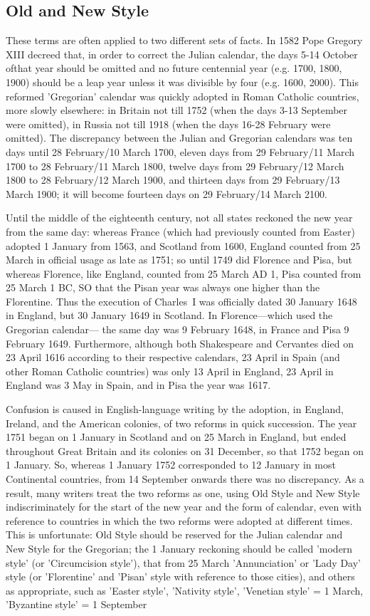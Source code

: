 \subsection{Old and New Style}
These terms are often applied to two different sets of facts. In 1582 Pope
Gregory XIII decreed that, in order to correct the Julian calendar, the
days 5-14 October ofthat year should be omitted and no future centennial
year (e.g. 1700, 1800, 1900) should be a leap year unless it was
divisible by four (e.g. 1600, 2000). This reformed 'Gregorian' calendar
was quickly adopted in Roman Catholic countries, more slowly elsewhere:
in Britain not till 1752 (when the days 3-13 September were
omitted), in Russia not till 1918 (when the days 16-28 February were
omitted). The discrepancy between the Julian and Gregorian calendars
was ten days until 28 February/10 March 1700, eleven days from 29
February/11 March 1700 to 28 February/11 March 1800, twelve days
from 29 February/12 March 1800 to 28 February/12 March 1900, and
thirteen days from 29 February/13 March 1900; it will become fourteen
days on 29 February/14 March 2100.

Until the middle of the eighteenth century, not all states reckoned the
new year from the same day: whereas France (which had previously
counted from Easter) adopted 1 January from 1563, and Scotland from
1600, England counted from 25 March in official usage as late as 1751; so
until 1749 did Florence and Pisa, but whereas Florence, like England,
counted from 25 March AD 1, Pisa counted from 25 March 1 BC, SO that the
Pisan year was always one higher than the Florentine. Thus the execution
of Charles~I was officially dated 30 January 1648 in England, but 30
January 1649 in Scotland. In Florence---which used the Gregorian calendar---
the same day was 9 February 1648, in France and Pisa 9 February
1649. Furthermore, although both Shakespeare and Cervantes died on 23
April 1616 according to their respective calendars, 23 April in Spain (and
other Roman Catholic countries) was only 13 April in England, 23 April in
England was 3 May in Spain, and in Pisa the year was 1617.

Confusion is caused in English-language writing by the adoption, in
England, Ireland, and the American colonies, of two reforms in quick
succession. The year 1751 began on 1 January in Scotland and on 25
March in England, but ended throughout Great Britain and its colonies
on 31 December, so that 1752 began on 1 January. So, whereas 1 January
1752 corresponded to 12 January in most Continental countries, from 14
September onwards there was no discrepancy.
As a result, many writers treat the two reforms as one, using Old Style
and New Style indiscriminately for the start of the new year and the
form of calendar, even with reference to countries in which the two
reforms were adopted at different times. This is unfortunate: Old Style
should be reserved for the Julian calendar and New Style for the Gregorian;
the 1 January reckoning should be called 'modern style' (or 'Circumcision
style'), that from 25 March 'Annunciation' or 'Lady Day' style (or
'Florentine' and 'Pisan' style with reference to those cities), and others
as appropriate, such as 'Easter style', 'Nativity style', 'Venetian style' =
1 March, 'Byzantine style' = 1 September

